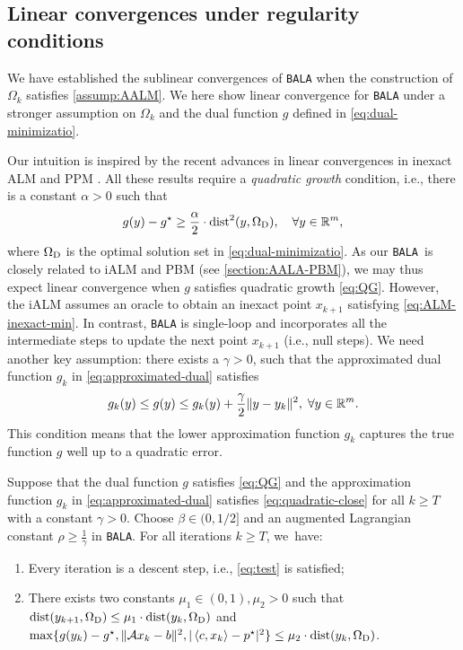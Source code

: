 \documentclass[11pt]{article}
\newcommand{\alg}{\texttt{BALA}}%
\begin{document}
\subsection{Linear convergences under regularity conditions}
\label{subsection:linear}
We have established the sublinear convergences of \alg{}  when the construction of $\Omega_k$ satisfies \cref{assump:AALM}. We here show linear convergence for \alg{} under a stronger assumption on $\Omega_k$ and the dual function $g$ defined in \eqref{eq:dual-minimizatio}. 

Our intuition is inspired by the recent advances in linear convergences in inexact ALM and PPM \cite{cui2019r,liao2024inexact,liao2024error}. All these results require a \textit{quadratic growth} condition, i.e., there is a constant $\alpha > 0$ such that 
\begin{equation}
\label{eq:QG}
    g(y) - g^\star \geq \frac{\alpha}{2} \cdot  \mathrm{dist}^2(y,\Omega_{\mathrm{D}}), \quad \forall y \in \mathbb{R}^m, 
\end{equation}
where $\Omega_{\mathrm{D}}$ is the optimal solution set in \cref{eq:dual-minimizatio}. As our \alg~is closely related to iALM and PBM (see \cref{section:AALA-PBM}), we may thus expect linear convergence when $g$ satisfies quadratic growth \cref{eq:QG}. However, the iALM assumes an oracle to obtain an inexact point $x_{k+1}$ satisfying \eqref{eq:ALM-inexact-min}. In contrast, \alg{} is single-loop and incorporates all the intermediate steps to update the next point $x_{k+1}$ (i.e., null steps). We need another key assumption: there exists a $\gamma > 0$, such that the approximated dual function $g_k$ in \eqref{eq:approximated-dual} satisfies 
\begin{equation}
    \label{eq:quadratic-close}
    g_k(y) \leq  g(y)  \leq g_k(y) + \frac{\gamma}{2}\|y-y_k\|^2,\; \forall y \in \mathbb{R}^m.
\end{equation}
This condition means that the lower approximation function $g_k$ captures the true function $g$ well up to a quadratic error. 

\begin{theorem} 
    \label{thm:linear-convergence}
    Suppose that the dual function $g$ satisfies \eqref{eq:QG} and the approximation function $g_k$ in \eqref{eq:approximated-dual} satisfies \eqref{eq:quadratic-close} for all $k\geq T$ with a constant $\gamma > 0$. Choose $\beta \in (0,1/2]$ and an augmented Lagrangian constant $\rho\geq \frac{1}{\gamma}$ in \alg{}. For all iterations $k \geq T$, we~have:     
    \begin{enumerate}[leftmargin=*]
    \setlength{\itemsep}{0pt}
        \item Every iteration is a descent step, i.e., \eqref{eq:test} is satisfied;
        \item There exists two constants $\mu_1 \in (0,1), \mu_2 > 0$ such that  $\mathrm{dist}(y_{k+1}, \Omega_{\mathrm{D}}) \leq \mu_1 \cdot \mathrm{dist}(y_{k}, \Omega_{\mathrm{D}})$ and $\max\{g(y_k) - g^\star, \|\mathcal{A} x_{k} - b \|^2, | \left \langle c, x_k \right\rangle - p^\star |^2\}  \leq \mu_2  \cdot  \mathrm{dist}(y_{k}, \Omega_{\mathrm{D}})$. 
    \end{enumerate}
\end{theorem}
\end{document}
